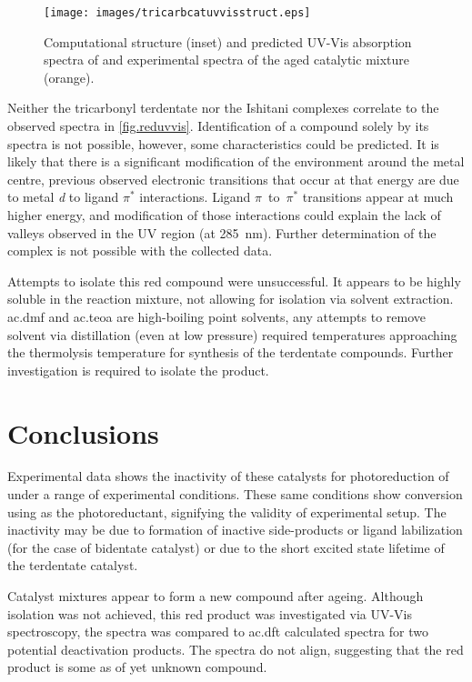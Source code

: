 \begin{figure}[!htbp]
 \begin{center}
  \texttt{[image: images/tricarbcatuvvisstruct.eps]}
 \end{center}
 \caption[Structure and absorption spectra of proposed .]{Computational structure (inset) and predicted UV-Vis absorption spectra of  and experimental spectra of the aged catalytic mixture (orange).}
 \label{fig.uvvistricarb}
\end{figure}

Neither the tricarbonyl terdentate nor the Ishitani complexes correlate to the observed spectra in \autoref{fig.reduvvis}. Identification of a compound solely by its spectra is not possible, however, some characteristics could be predicted. It is likely that there is a significant modification of the environment around the metal centre, previous observed electronic transitions that occur at that energy are due to metal \textit{d} to ligand $\pi^\ast$ interactions. Ligand $\pi$~to~$\pi^\ast$ transitions appear at much higher energy, and modification of those interactions could explain the lack of valleys observed in  the UV region (at 285~nm). Further determination of the complex is not possible with the collected data.

Attempts to isolate this red compound were unsuccessful. It appears to be highly soluble in the reaction mixture, not allowing for isolation via solvent extraction.  \Gls{ac.dmf} and \gls{ac.teoa} are high-boiling point solvents, any attempts to remove solvent via distillation (even at low pressure) required temperatures approaching the thermolysis temperature for synthesis of the terdentate compounds. Further investigation is required to isolate the product.

\section{Conclusions}

Experimental data shows the inactivity of these catalysts for photoreduction of  under a range of experimental conditions. These same conditions show conversion using  as the photoreductant, signifying the validity of experimental setup. The inactivity may be due to formation of inactive side-products or ligand labilization (for the case of bidentate catalyst) or due to the short excited state lifetime of the terdentate catalyst. 

Catalyst mixtures appear to form a new compound after ageing. Although isolation was not achieved, this red product was investigated via UV-Vis spectroscopy, the spectra was compared to \gls{ac.dft} calculated spectra for two potential deactivation products. The spectra do not align, suggesting that the red product is some as of yet unknown compound. 
